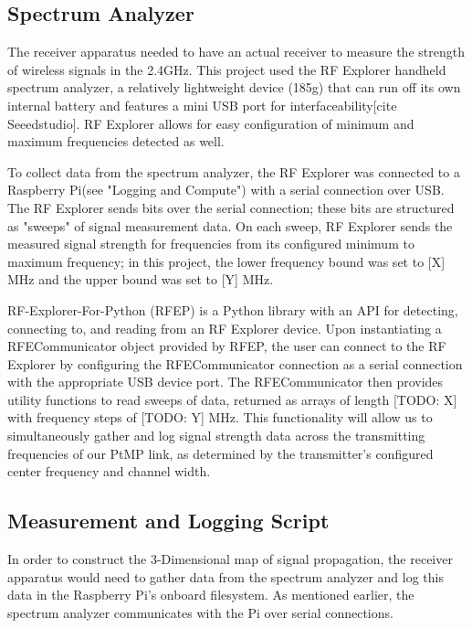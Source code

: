 \documentclass[pageno]{jpaper}
\begin{document}
\subsection{Spectrum Analyzer}
The receiver apparatus needed to have an actual receiver to measure the strength of wireless signals in the 2.4GHz. This project used the RF Explorer handheld spectrum analyzer, a relatively lightweight device (185g) that can run off its own internal battery and features a mini USB port for interfaceability[cite Seeedstudio]. RF Explorer allows for easy configuration of minimum and maximum frequencies detected as well.

To collect data from the spectrum analyzer, the RF Explorer was connected to a Raspberry Pi(see "Logging and Compute") with a serial connection over USB. The RF Explorer sends bits over the serial connection; these bits are structured as "sweeps" of signal measurement data.  On each sweep, RF Explorer sends the measured signal strength for frequencies from its configured minimum to maximum frequency; in this project, the lower frequency bound was set to [X] MHz and the upper bound was set to [Y] MHz. 

RF-Explorer-For-Python (RFEP) is a Python library with an API for detecting, connecting to, and reading from an RF Explorer device. Upon instantiating a RFECommunicator object provided by RFEP, the user can connect to the RF Explorer by configuring the RFECommunicator connection as a serial connection with the appropriate USB device port. The RFECommunicator then provides utility functions to read sweeps of data, returned as arrays of length [TODO: X] with frequency steps of [TODO: Y] MHz. This functionality will allow us to simultaneously gather and log signal strength data across the transmitting frequencies of our PtMP link, as determined by the transmitter's configured center frequency and channel width.

\subsection{Measurement and Logging Script}

In order to construct the 3-Dimensional map of signal propagation, the receiver apparatus would need to gather data from the spectrum analyzer and log this data in the Raspberry Pi's onboard filesystem. As mentioned earlier, the spectrum analyzer communicates with the Pi over serial connections.
\end{document}
